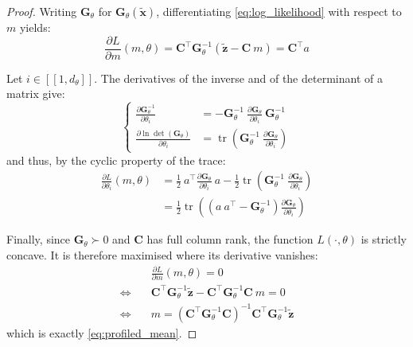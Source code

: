 \begin{proof}
	Writing $\mathbf{G}_\theta$ for $\mathbf{G}_\theta(\tilde{\mathbf{x}})$, differentiating \eqref{eq:log_likelihood} with respect to $m$ yields:
	\begin{equation}
		\frac{\partial L}{\partial m}(m,\theta)=\mathbf{C}^\top \mathbf{G}_\theta^{-1}\left(\tilde{\mathbf{z}}-\mathbf{C}\:m\right)=\mathbf{C}^\top a
	\end{equation}

	Let $i\in[\![1,d_\theta]\!]$. The derivatives of the inverse and of the determinant of a matrix \cite{bib:matrix-cookbook} give:
	\begin{equation}
		\left\{\begin{aligned}
		\frac{\partial \mathbf{G}_\theta^{-1}}{\partial\theta_i}&=-\mathbf{G}_\theta^{-1}\:\frac{\partial \mathbf{G}_\theta}{\partial\theta_i}\:\mathbf{G}_\theta^{-1}\\
		\frac{\partial\ln\det(\mathbf{G}_\theta)}{\partial\theta_i}&=\operatorname{tr}\left(\mathbf{G}_\theta^{-1}\:\frac{\partial \mathbf{G}_\theta}{\partial\theta_i}\right)
		\end{aligned}\right.
	\end{equation}
	and thus, by the cyclic property of the trace:
	\begin{equation}
		\begin{aligned}
		\frac{\partial L}{\partial\theta_i}(m,\theta)&=\frac{1}{2}\:a^\top\frac{\partial \mathbf{G}_\theta}{\partial\theta_i}\:a-\frac{1}{2}\operatorname{tr}\left(\mathbf{G}_\theta^{-1}\:\frac{\partial \mathbf{G}_\theta}{\partial\theta_i}\right)\\
		&=\frac{1}{2}\operatorname{tr}\left(\left(a\:a^\top-\mathbf{G}_\theta^{-1}\right)\frac{\partial \mathbf{G}_\theta}{\partial\theta_i}\right)
		\end{aligned}
	\end{equation}

	Finally, since $\mathbf{G}_\theta\succ0$ and $\mathbf{C}$ has full column rank, the function $L(\cdot,\theta)$ is strictly concave. It is therefore maximised where its derivative vanishes:
	\begin{equation}
		\begin{aligned}
		&\frac{\partial L}{\partial m}(m,\theta)=0\\
		\iff\quad&\mathbf{C}^\top \mathbf{G}_\theta^{-1}\tilde{\mathbf{z}}-\mathbf{C}^\top \mathbf{G}_\theta^{-1}\mathbf{C}\:m=0\\
		\iff\quad&m=\left(\mathbf{C}^\top \mathbf{G}_\theta^{-1}\mathbf{C}\right)^{-1}\mathbf{C}^\top \mathbf{G}_\theta^{-1}\tilde{\mathbf{z}}
		\end{aligned}
	\end{equation}
	which is exactly \eqref{eq:profiled_mean}.
\end{proof}

